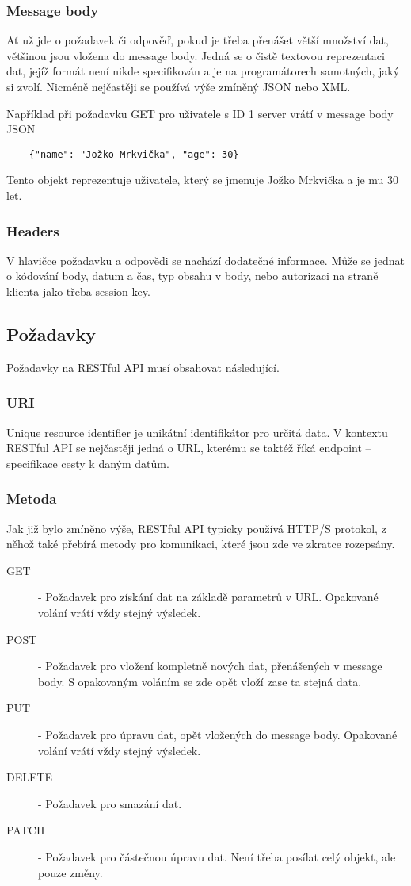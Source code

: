 \subsubsection*{Message body}
Ať už jde o požadavek či odpověď, pokud je třeba přenášet větší množství dat, většinou jsou vložena do message body. Jedná se o čistě textovou reprezentaci dat, jejíž formát není nikde specifikován a je na programátorech samotných, jaký si zvolí. Nicméně nejčastěji se používá výše zmíněný JSON nebo XML.

Například při požadavku GET pro uživatele s ID 1 server vrátí v message body JSON
\begin{verbatim}
	{"name": "Jožko Mrkvička", "age": 30}
\end{verbatim}
Tento objekt reprezentuje uživatele, který se jmenuje Jožko Mrkvička a je mu 30 let.

\subsubsection*{Headers}
V hlavičce požadavku a odpovědi se nachází dodatečné informace. Může se jednat o kódování body, datum a čas, typ obsahu v body, nebo autorizaci na straně klienta jako třeba session key.


\subsection{Požadavky}
Požadavky na RESTful API musí obsahovat následující.

\subsubsection*{URI}
Unique resource identifier je unikátní identifikátor pro určitá data. V kontextu RESTful API se nejčastěji jedná o URL, kterému se taktéž říká endpoint -- specifikace cesty k daným datům.

\subsubsection*{Metoda}
Jak již bylo zmíněno výše, RESTful API typicky používá HTTP/S protokol, z něhož také přebírá metody pro komunikaci, které jsou zde ve zkratce rozepsány.

\begin{description}
    \item[GET] - Požadavek pro získání dat na základě parametrů v URL. Opakované volání vrátí vždy stejný výsledek.
    \item[POST] - Požadavek pro vložení kompletně nových dat, přenášených v message body. S opakovaným voláním se zde opět vloží zase ta stejná data.
    \item[PUT] - Požadavek pro úpravu dat, opět vložených do message body. Opakované volání vrátí vždy stejný výsledek.
    \item[DELETE] - Požadavek pro smazání dat.
    \item[PATCH] - Požadavek pro částečnou úpravu dat. Není třeba posílat celý objekt, ale pouze změny.
\end{description}


